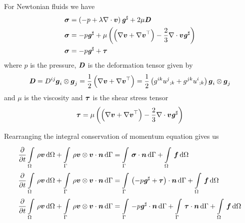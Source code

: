 For Newtonian fluids we have
\begin{equation}
  \begin{split}
    \tensor{\sigma}&=\pbrac{-p+\lambda\divergence{}{\vectr{v}}}\sharptensor{\tensor{g}}+2\mu\tensor{D} \\
    \tensor{\sigma}&=-p\sharptensor{\tensor{g}}+\mu\pbrac{\pbrac{\gradient{}{\vectr{v}}+\transpose{\gradient{}{\vectr{v}}}}-
      \frac{2}{3}\divergence{}{\vectr{v}}\sharptensor{\tensor{g}}}\\
    \tensor{\sigma}&=-p\sharptensor{\tensor{g}}+\tensor{\tau}
  \end{split}
\end{equation}
where $p$ is the pressure, $\boldsymbol{\mathit{D}}$ is the deformation tensor given by
\begin{equation}
  \tensor{D}=D^{ij}\tensorprod{\vectr{g}_{i}}{\vectr{g}_{j}}=\frac{1}{2}\pbrac{\gradient{}{\vectr{v}}+\transpose{\gradient{}{\vectr{v}}}}=\frac{1}{2}\pbrac{g^{ik}\covarderiv{u^{j}}{k}+g^{jk}\covarderiv{u^{i}}{k}}\tensorprod{\vectr{g}_{i}}{\vectr{g}_{j}}
\end{equation}
and $\mu$ is the viscosity and $\boldsymbol{\mathit{\tau}}$ is the shear stress tensor \ie
\begin{equation}
  \tensor{\tau}=\mu\pbrac{\pbrac{\gradient{}{\vectr{v}}+\transpose{\gradient{}{\vectr{v}}}}-
    \frac{2}{3}\divergence{}{\vectr{v}}\sharptensor{\tensor{g}}}
\end{equation}

Rearranging the integral conservation of momentum equation gives us
\begin{equation}
  \begin{split}
    \delby{}{t}\gint{\Omega}{}{\rho\vectr{v}}{\Omega}
    +\gint{\Gamma}{}{\dotprod{\tensorprod{\rho\vectr{v}}{\vectr{v}}}{\vectr{n}}}{\Gamma}
    &=\gint{\Gamma}{}{\dotprod{\tensor{\sigma}}{\vectr{n}}}{\Gamma}+\gint{\Omega}{}{\vectr{f}}{\Omega}\\
    \delby{}{t}\gint{\Omega}{}{\rho\vectr{v}}{\Omega}
    +\gint{\Gamma}{}{\dotprod{\tensorprod{\rho\vectr{v}}{\vectr{v}}}{\vectr{n}}}{\Gamma}
    &=\gint{\Gamma}{}{\dotprod{\pbrac{-p\sharptensor{\tensor{g}}+\tensor{\tau}}}{\vectr{n}}}{\Gamma}
    +\gint{\Omega}{}{\vectr{f}}{\Omega}
    \\ \delby{}{t}\gint{\Omega}{}{\rho\vectr{v}}{\Omega}
    +\gint{\Gamma}{}{\dotprod{\tensorprod{\rho\vectr{v}}{\vectr{v}}}{\vectr{n}}}{\Gamma}
    &=\gint{\Gamma}{}{\dotprod{-p\sharptensor{\tensor{g}}}{\vectr{n}}}{\Gamma}
    +\gint{\Gamma}{}{\dotprod{\tensor{\tau}}{\vectr{n}}}{\Gamma}+\gint{\Omega}{}{\vectr{f}}{\Omega}\\
  \end{split}
  \label{eqn:NSEIntegralConservationOfMomentum}
\end{equation}

